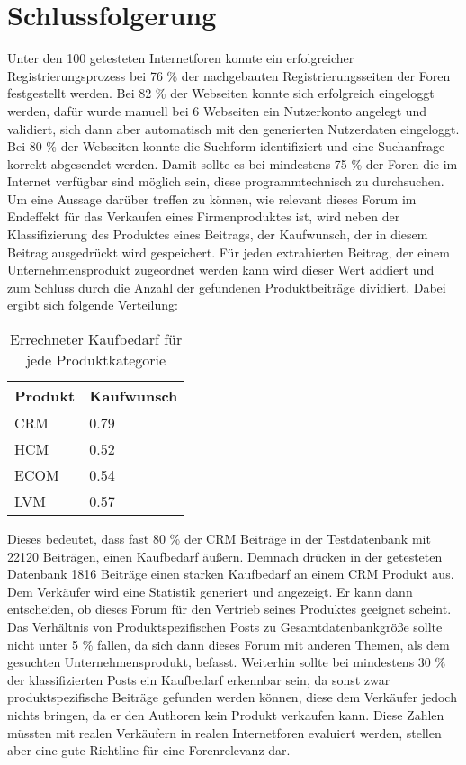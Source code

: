 \section{Schlussfolgerung}
Unter den 100 getesteten Internetforen konnte ein erfolgreicher Registrierungsprozess bei 76 \% der nachgebauten Registrierungsseiten der Foren festgestellt werden. Bei 82 \% der Webseiten konnte sich erfolgreich eingeloggt werden, dafür wurde manuell bei 6 Webseiten ein Nutzerkonto angelegt und validiert, sich dann aber automatisch mit den generierten Nutzerdaten eingeloggt. Bei 80 \% der Webseiten konnte die Suchform identifiziert und eine Suchanfrage korrekt abgesendet werden. Damit sollte es bei mindestens 75 \% der Foren die im Internet verfügbar sind möglich sein, diese programmtechnisch zu durchsuchen.
Um eine Aussage darüber treffen zu können, wie relevant dieses Forum im Endeffekt für das Verkaufen eines Firmenproduktes ist, wird neben der Klassifizierung des Produktes eines Beitrags, der Kaufwunsch, der in diesem Beitrag ausgedrückt wird gespeichert. Für jeden extrahierten Beitrag, der einem Unternehmensprodukt zugeordnet werden kann wird dieser Wert addiert und zum Schluss durch die Anzahl der gefundenen Produktbeiträge dividiert. Dabei ergibt sich folgende Verteilung: 

\begin{table}[h!]
\centering
\begin{tabular}{ | p{3cm} | l |}
\hline
Produkt & Kaufwunsch\\ \hline
CRM & 0.79\\ \hline
HCM & 0.52 \\ \hline
ECOM & 0.54 \\ \hline
LVM & 0.57 \\ \hline
\end{tabular}
\caption{Errechneter Kaufbedarf für jede Produktkategorie}
\end{table}

Dieses bedeutet, dass fast 80 \% der CRM Beiträge in der Testdatenbank mit 22120 Beiträgen, einen Kaufbedarf äußern. Demnach drücken in der getesteten Datenbank 1816 Beiträge einen starken Kaufbedarf an einem CRM Produkt aus. Dem Verkäufer wird eine Statistik generiert und angezeigt. Er kann dann entscheiden, ob dieses Forum für den Vertrieb seines Produktes geeignet scheint. Das Verhältnis von Produktspezifischen Posts zu Gesamtdatenbankgröße sollte nicht unter 5 \% fallen, da sich dann dieses Forum mit anderen Themen, als dem gesuchten Unternehmensprodukt, befasst. Weiterhin sollte bei mindestens 30 \% der klassifizierten Posts ein Kaufbedarf erkennbar sein, da sonst zwar produktspezifische Beiträge gefunden werden können, diese dem Verkäufer jedoch nichts bringen, da er den Authoren kein Produkt verkaufen kann. Diese Zahlen müssten mit realen Verkäufern in realen Internetforen evaluiert werden, stellen aber eine gute Richtline für eine Forenrelevanz dar.

